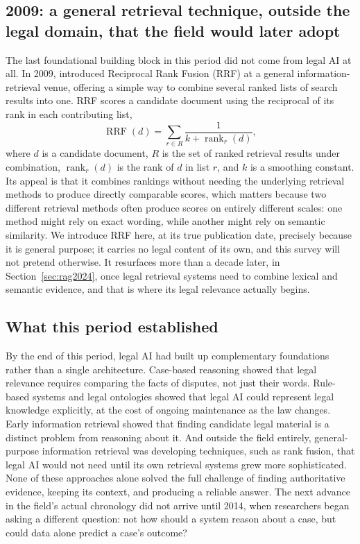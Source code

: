 \subsection{2009: a general retrieval technique, outside the legal domain, that the field would later adopt}

The last foundational building block in this period did not come from legal AI at all. In 2009,
\citet{cormack2009} introduced Reciprocal Rank Fusion (RRF) at a general information-retrieval
venue, offering a simple way to combine several ranked lists of search results into one. RRF scores
a candidate document using the reciprocal of its rank in each contributing list,
\begin{equation}
\operatorname{RRF}(d)=\sum_{r \in R}\frac{1}{k+\operatorname{rank}_{r}(d)},
\end{equation}
where $d$ is a candidate document, $R$ is the set of ranked retrieval results under combination,
$\operatorname{rank}_r(d)$ is the rank of $d$ in list $r$, and $k$ is a smoothing constant. Its
appeal is that it combines rankings without needing the underlying retrieval methods to produce
directly comparable scores, which matters because two different retrieval methods often produce
scores on entirely different scales: one method might rely on exact wording, while another might
rely on semantic similarity. We introduce RRF here, at its true publication date, precisely because
it is general purpose; it carries no legal content of its own, and this survey will not pretend
otherwise. It resurfaces more than a decade later, in Section~\ref{sec:rag2024}, once legal retrieval
systems need to combine lexical and semantic evidence, and that is where its legal relevance
actually begins.

\subsection{What this period established}

By the end of this period, legal AI had built up complementary foundations rather than a single
architecture. Case-based reasoning showed that legal relevance requires comparing the facts of
disputes, not just their words. Rule-based systems and legal ontologies showed that legal AI could
represent legal knowledge explicitly, at the cost of ongoing maintenance as the law changes. Early
information retrieval showed that finding candidate legal material is a distinct problem from
reasoning about it. And outside the field entirely, general-purpose information retrieval was
developing techniques, such as rank fusion, that legal AI would not need until its own retrieval
systems grew more sophisticated. None of these approaches alone solved the full challenge of finding
authoritative evidence, keeping its context, and producing a reliable answer. The next advance in
the field's actual chronology did not arrive until 2014, when researchers began asking a different
question: not how should a system reason about a case, but could data alone predict a case's
outcome?
